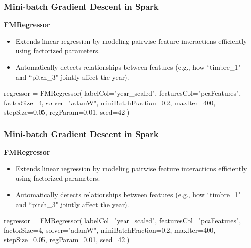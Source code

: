 \documentclass{beamer}
\begin{document}
\begin{frame}[fragile]
    \frametitle{Mini-batch Gradient Descent in Spark}
    \textbf{FMRegressor}
    \begin{itemize}
        \item Extends linear regression by modeling pairwise feature interactions efficiently using factorized parameters. 
        \item Automatically detects relationships between features (e.g., how ``timbre\_1" and ``pitch\_3" jointly affect the year).
    \end{itemize}
    
    \begin{mycodetiny}
        regressor = FMRegressor(
            labelCol="year_scaled",
            featuresCol="pcaFeatures",
            factorSize=4,
            solver="adamW",
            miniBatchFraction=0.2,
            maxIter=400,
            stepSize=0.05,
            regParam=0.01,
            seed=42
        )
    \end{mycodetiny}
\end{frame}


\begin{frame}[fragile]
    \frametitle{Mini-batch Gradient Descent in Spark}
    \textbf{FMRegressor}
    \begin{itemize}
        \item Extends linear regression by modeling pairwise feature interactions efficiently using factorized parameters. 
        \item Automatically detects relationships between features (e.g., how ``timbre\_1" and ``pitch\_3" jointly affect the year).
    \end{itemize}
    
    \begin{mycodetiny}
        regressor = FMRegressor(
            labelCol="year_scaled",
            featuresCol="pcaFeatures",
            factorSize=4,
            solver="adamW",
            miniBatchFraction=0.2,
            maxIter=400,
            stepSize=0.05,
            regParam=0.01,
            seed=42
        )
    \end{mycodetiny}
\end{frame}
\end{document}
